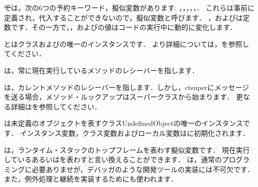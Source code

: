 \documentclass[a4paper,10pt,twoside]{book}
\begin{document}
\st では，次の6つの予約キーワード，擬似変数があります:
，，，，，．
これらは事前に定義され，代入することができないので，擬似変数と呼びます．
，およびは定数です．その一方で，，およびの値はコードの実行中に動的に変化します．

とはクラスおよびの唯一のインスタンスです．
より詳細については，を参照してください．

は，常に現在実行しているメソッドのレシーバーを指します．

は，カレントメソッドのレシーバーを指します．しかし，ct{super}にメッセージを送る場合，メソッド・ルックアップはスーパークラスから始まります．
更なる詳細はを参照してください．

は未定義のオブジェクトを表すクラスUndefinedObjectの唯一のインスタンスです．
インスタンス変数，クラス変数およびローカル変数はに初期化されます．

は，ランタイム・スタックのトップフレームを表わす擬似変数です．
現在実行しているあるいはを表わすと言い換えることができます．
は，通常のプログラミングに必要ありませが，デバッガのような開発ツールの実装には不可欠です．
また，例外処理と継続を実装するためにも使われます．
\end{document}
